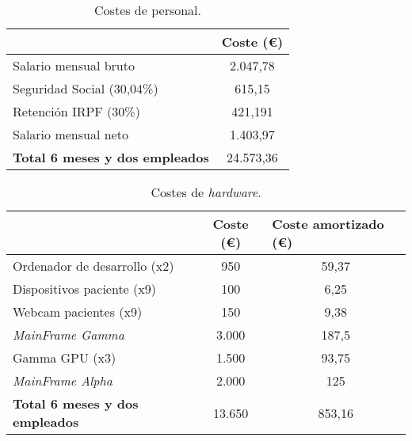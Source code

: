 \begin{table}[H]
\centering
\begin{tabular}{lc}
\hline
\rowcolor[HTML]{EFEFEF} 
\multicolumn{1}{c}{\cellcolor[HTML]{EFEFEF}\textbf{Concepto}} & \textbf{Coste (€)} \\ \hline
\rowcolor[HTML]{ECF4FF} 
Salario mensual bruto ~\cite{salariales}                                        & 2.047,78           \\
\rowcolor[HTML]{EFEFEF} 
Seguridad Social (30,04\%)                                    & 615,15             \\
\rowcolor[HTML]{ECF4FF} 
Retención IRPF (30\%)                                         & 421,191            \\
\rowcolor[HTML]{EFEFEF} 
Salario mensual neto                                          & 1.403,97           \\ \hline
\rowcolor[HTML]{ECF4FF} 
\textbf{Total 6 meses y dos empleados}                        & 24.573,36          \\ \hline
\end{tabular}
\caption{Costes de personal.}
\label{tablaA1}
\end{table}


\begin{table}[H]
\centering
\begin{tabular}{lcc}
\hline
\rowcolor[HTML]{EFEFEF} 
\multicolumn{1}{c}{\cellcolor[HTML]{EFEFEF}\textbf{Concepto}} & \textbf{Coste (€)} & \multicolumn{1}{l}{\cellcolor[HTML]{EFEFEF}\textbf{Coste amortizado (€)}} \\ \hline
\rowcolor[HTML]{ECF4FF} 
Ordenador de desarrollo (x2)                                  & 950                & 59,37                                                                     \\
\rowcolor[HTML]{EFEFEF} 
Dispositivos paciente (x9)                                    & 100                & 6,25                                                                      \\
\rowcolor[HTML]{ECF4FF} 
Webcam pacientes (x9)                                         & 150                & 9,38                                                                      \\
\rowcolor[HTML]{EFEFEF} 
\textit{MainFrame Gamma}                                      & 3.000              & 187,5                                                                     \\
\rowcolor[HTML]{ECF4FF} 
Gamma GPU (x3)                                                & 1.500              & 93,75                                                                     \\
\rowcolor[HTML]{EFEFEF} 
\textit{MainFrame Alpha}                                      & 2.000              & 125                                                                       \\ \hline
\rowcolor[HTML]{ECF4FF} 
\textbf{Total 6 meses y dos empleados}                        & 13.650             & 853,16 
\end{tabular}
\caption{Costes de \textit{hardware}.}
\label{tablaA2}
\end{table}

